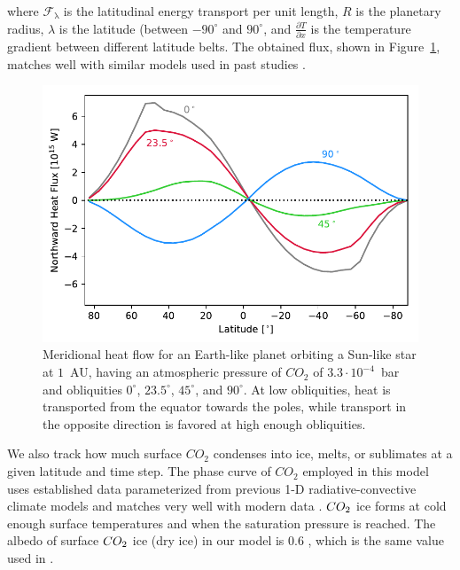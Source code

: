\documentclass[fleqn,usenatbib]{mnras}
\begin{document}
where $\mathcal{F}_{\mathrm{\lambda}}$ is the latitudinal energy transport per unit length, $R$ is the planetary radius, $\lambda$ is the latitude (between $-90^\circ$ and $90^\circ$, and $\frac{\partial T}{\partial x}$ is the temperature gradient between different latitude belts.
The obtained flux, shown in Figure~\ref{fig:flow}, matches well with similar models used in past studies \citep[e.g.,][]{WilliamsPollard}.

\begin{figure}
	\includegraphics[width=\columnwidth]{Figures/Meridional_flow.pdf}
    \caption{Meridional heat flow for an Earth-like planet  orbiting a Sun-like star at $1$~AU, having an atmospheric pressure of $CO_{\mathrm{2}}$ of $3.3\cdot10^{-4}$~bar and obliquities $0^\circ$, $23.5^\circ$, $45^\circ$, and $90^\circ$. At low obliquities, heat is transported from the equator towards the poles, while transport in the opposite direction is favored at high enough obliquities.}
    \label{fig:flow}
\end{figure}

We also track how much surface $CO_{\mathrm{2}}$  condenses into ice, melts, or sublimates at a given latitude and time step. The phase curve of $CO_{\mathrm{2}}$ employed in this model uses established data parameterized from previous 1-D radiative-convective climate models \citep{Kasting1991} and matches very well with modern data \citep{fray_sublimation_2009}. $CO_{\rm 2}$ ice forms at cold enough surface temperatures  and when the saturation pressure is reached.  The albedo of surface $CO_{\rm 2}$ ice (dry ice) in our model is 0.6 \citet{warren_spectral_1990}, which is the same value used in \citet{Turbet2017}.
\end{document}
